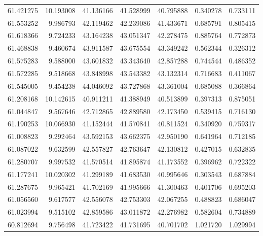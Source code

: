 \begin{tabular}{rrrrrrr}
 61.421275 &  10.193008 &         41.136166 &         41.528999 &         40.795888 &  0.340278 &  0.733111 \\
 61.553252 &   9.986793 &         42.119462 &         42.239086 &         41.433671 &  0.685791 &  0.805415 \\
 61.618366 &   9.724233 &         43.164238 &         43.051347 &         42.278475 &  0.885764 &  0.772873 \\
 61.468838 &   9.460674 &         43.911587 &         43.675554 &         43.349242 &  0.562344 &  0.326312 \\
 61.575283 &   9.588000 &         43.601832 &         43.343640 &         42.857288 &  0.744544 &  0.486352 \\
 61.572285 &   9.518668 &         43.848998 &         43.543382 &         43.132314 &  0.716683 &  0.411067 \\
 61.545005 &   9.454238 &         44.046092 &         43.727868 &         43.361004 &  0.685088 &  0.366864 \\
 61.208168 &  10.142615 &         40.911211 &         41.388949 &         40.513899 &  0.397313 &  0.875051 \\
 61.044847 &   9.567646 &         42.712865 &         42.889580 &         42.173450 &  0.539415 &  0.716130 \\
 61.190253 &  10.066930 &         41.152444 &         41.570841 &         40.811524 &  0.340920 &  0.759317 \\
 61.008823 &   9.292464 &         43.592153 &         43.662375 &         42.950190 &  0.641964 &  0.712185 \\
 61.087022 &   9.632599 &         42.557827 &         42.763647 &         42.130812 &  0.427015 &  0.632835 \\
 61.280707 &   9.997532 &         41.570514 &         41.895874 &         41.173552 &  0.396962 &  0.722322 \\
 61.177241 &  10.020302 &         41.299189 &         41.683530 &         40.995646 &  0.303543 &  0.687884 \\
 61.287675 &   9.965421 &         41.702169 &         41.995666 &         41.300463 &  0.401706 &  0.695203 \\
 61.056560 &   9.617577 &         42.556078 &         42.753303 &         42.067255 &  0.488823 &  0.686047 \\
 61.023994 &   9.515102 &         42.859586 &         43.011872 &         42.276982 &  0.582604 &  0.734889 \\
 60.812694 &   9.756498 &         41.723422 &         41.731695 &         40.701702 &  1.021720 &  1.029994 \\

\end{tabular}

